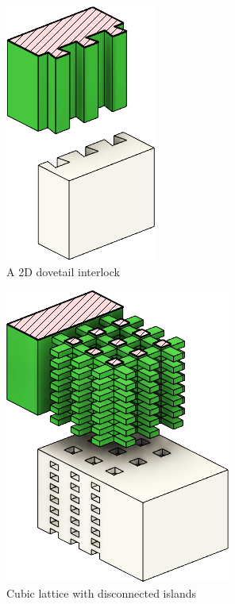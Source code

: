 \begin{figure}
	\centering
	\setlength{\figheight}{.45\columnwidth}\centering
	\begin{subfigure}[B]{.25\columnwidth}
		\includegraphics[height=\figheight]{sources-method-basic_2d_interlock.png}
		\caption{A 2D dovetail interlock}
		\label{interlocking:fig:basic_2d_interlock}
	\end{subfigure}
	\begin{subfigure}[B]{.36\columnwidth}\centering
		\includegraphics[height=\figheight]{sources-method-discontinuous_lattice.png}
		\caption{Cubic lattice with disconnected islands}
		\label{interlocking:fig:discontinuous_lattice}
	\end{subfigure}
	\begin{subfigure}[B]{.36\columnwidth}\centering

\end{subfigure}
\end{figure}
